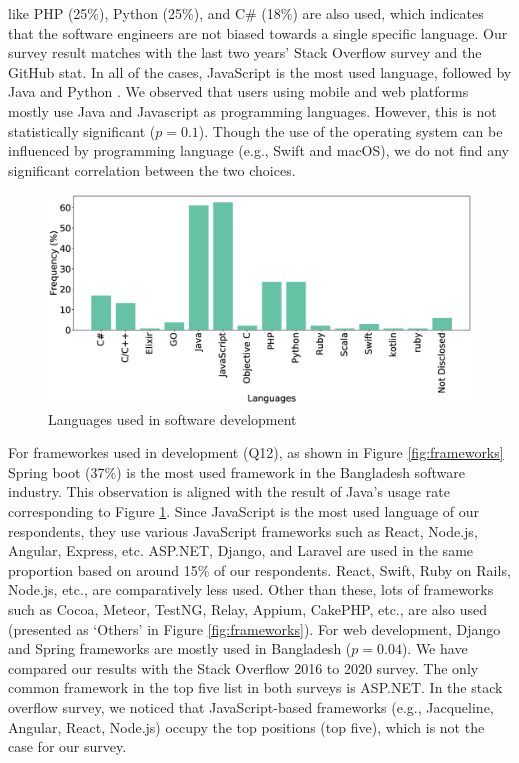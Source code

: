 like PHP (25\%), Python (25\%), and C\# (18\%) are also used, which indicates
that the software engineers are not biased towards a single specific language.
Our survey result matches with the last two years' Stack Overflow survey and the
GitHub stat. In all of the cases, JavaScript is the most used language, followed
by Java and Python \cite{StackoverflowSurvey2020, StackoverflowSurvey2019,
GithubStat}. We
observed that users using mobile and web platforms mostly use Java and
Javascript as programming languages. However, this is not statistically
significant ($p=0.1$). Though the use of the operating system can be influenced by
programming language (e.g., Swift and macOS), we do not find any significant correlation
between the two choices.
\begin{figure}[t]
\centering
  \includegraphics[scale=0.18]{Figures/Respondents_languages}
  \caption{Languages used in software development}
  \label{fig:languages}
\end{figure}

For frameworkes used in development (Q12), as shown in Figure \ref{fig:frameworks} Spring boot (37\%) is the most used framework in the Bangladesh software industry. 
This observation is aligned with the result of Java's usage rate corresponding
to Figure \ref{fig:languages}. Since JavaScript is the most used language of our
respondents, they use various JavaScript frameworks such as React, Node.js,
Angular, Express, etc. ASP.NET, Django, and
Laravel are used in the same proportion based on around 15\% of our respondents.
React, Swift, Ruby on Rails, Node.js, etc., are comparatively less used. Other
than these, lots of frameworks such as Cocoa, Meteor, TestNG, Relay, Appium,
CakePHP, etc., are also used (presented as `Others' in Figure \ref{fig:frameworks}). For web development, Django
and Spring frameworks are mostly used in Bangladesh ($p=0.04$). We have compared
our results with the Stack Overflow 2016 to 2020
survey\cite{StackoverflowSurvey2017, StackoverflowSurvey2018,
StackoverflowSurvey2019, StackoverflowSurvey2020}. The only common framework in
the top five list in both surveys is ASP.NET. In the stack overflow survey, we
noticed that JavaScript-based frameworks (e.g., Jacqueline, Angular, React,
Node.js) occupy the top positions (top five), which is not the case for our
survey.

